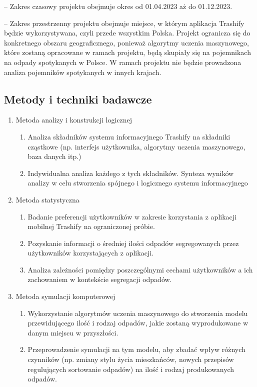 \documentclass[12pt,oneside]{book}
\begin{document}
-- Zakres czasowy projektu obejmuje okres od 01.04.2023 aż do 01.12.2023.

-- Zakres przestrzenny projektu obejmuje miejsce, w którym aplikacja Trashify będzie wykorzystywana, czyli przede wszystkim Polska. Projekt ogranicza się do konkretnego obszaru geograficznego, ponieważ algorytmy uczenia maszynowego, które zostaną opracowane w ramach projektu, będą skupiały się na pojemnikach na odpady spotykanych w Polsce. W ramach projektu nie będzie prowadzona analiza pojemników spotykanych w innych krajach.

\subsection{Metody i techniki badawcze}

\begin{enumerate}
    \item Metoda analizy i konstrukcji logicznej
    
    \begin{enumerate}[label=--]
        \item Analiza składników systemu informacyjnego Trashify na składniki cząstkowe (np. interfejs użytkownika, algorytmy uczenia maszynowego, baza danych itp.)
        \item Indywidualna analiza każdego z tych składników.
        Synteza wyników analizy w celu stworzenia spójnego i logicznego systemu informacyjnego
    \end{enumerate}

    \item Metoda statystyczna
    
    \begin{enumerate}[label=--]
        \item Badanie preferencji użytkowników w zakresie korzystania z aplikacji mobilnej Trashify na ograniczonej próbie.
        \item Pozyskanie informacji o średniej ilości odpadów segregowanych przez użytkowników korzystających z aplikacji.
        \item Analiza zależności pomiędzy poszczególnymi cechami użytkowników a ich zachowaniem w kontekście segregacji odpadów.
    \end{enumerate}

    \item Metoda symulacji komputerowej
    
    \begin{enumerate}[label=--]
        \item Wykorzystanie algorytmów uczenia maszynowego do stworzenia modelu przewidującego ilość i rodzaj odpadów, jakie zostaną wyprodukowane w danym miejscu w przyszłości.
        \item Przeprowadzenie symulacji na tym modelu, aby zbadać wpływ różnych czynników (np. zmiany stylu życia mieszkańców, nowych przepisów regulujących sortowanie odpadów) na ilość i rodzaj produkowanych odpadów.
    \end{enumerate}


\end{enumerate}
\end{document}
